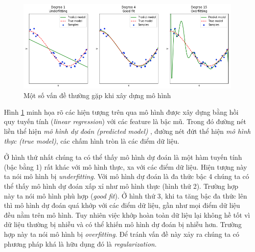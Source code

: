 \begin{center}
 	\begin{figure}[H]
    \begin{center}
    \includegraphics[scale=0.5]{chap3/image/overfitting.png}
    \end{center}
    \caption{Một số vấn đề thường gặp khi xây dựng mô hình}
    \label{fig:overfitting}
    \end{figure}
\end{center}
\par Hình \ref{fig:overfitting} minh họa rõ các hiện tượng trên qua mô hình được xây dựng bằng hồi quy tuyến tính (\textit{linear regression}) với các feature là bậc mũ. Trong đó đường nét liền thể hiện \textit{mô hình dự đoán (predicted model)} , đường nét đứt thể hiện \textit{mô hình thực (true model)}, các chấm hình tròn là các điểm dữ liệu. \par
Ở hình thứ nhất chúng ta có thể thấy mô hình dự đoán là một hàm tuyến tính (bậc bằng 1) rất khác với mô hình thực, xa với các điểm dữ liệu. Hiện tượng này ta nói mô hình bị \textit{underfitting}.
Với mô hình dự đoán là đa thức bậc 4 chúng ta có thể thấy mô hình dự đoán xấp xỉ như mô hình thực (hình thứ 2). Trường hợp này ta nói mô hình phù hợp (\textit{good fit}). Ở hình thứ 3, khi ta tăng bậc đa thức lên thì mô hình dự đoán quá khớp với các điểm dữ liệu, gần như mọi điểm dữ liệu đều nằm trên mô hình. Tuy nhiên việc khớp hoàn toàn dữ liệu lại không hề tốt vì dữ liệu thường bị nhiễu và có thể khiến mô hình dự đoán bị nhiễu hơn. Trường hợp này ta nói mô hình bị\textit{ overfitting}. Để tránh vấn đề này xảy ra chúng ta có phương pháp khá là hữu dụng đó là \textit{regularization}.

